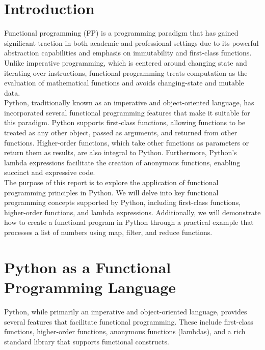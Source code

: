 \documentclass[a4paper]{article}
\begin{document}
\tableofcontents
\newpage

\section{Introduction}
Functional programming (FP) is a programming paradigm that has gained significant traction in both academic and professional settings due to its powerful abstraction capabilities and emphasis on immutability and first-class functions. Unlike imperative programming, which is centered around changing state and iterating over instructions, functional programming treats computation as the evaluation of mathematical functions and avoids changing-state and mutable data.\\

Python, traditionally known as an imperative and object-oriented language, has incorporated several functional programming features that make it suitable for this paradigm. Python supports first-class functions, allowing functions to be treated as any other object, passed as arguments, and returned from other functions. Higher-order functions, which take other functions as parameters or return them as results, are also integral to Python. Furthermore, Python's lambda expressions facilitate the creation of anonymous functions, enabling succinct and expressive code.\\

The purpose of this report is to explore the application of functional programming principles in Python. We will delve into key functional programming concepts supported by Python, including first-class functions, higher-order functions, and lambda expressions. Additionally, we will demonstrate how to create a functional program in Python through a practical example that processes a list of numbers using map, filter, and reduce functions.\\

\newpage


\section{Python as a Functional Programming Language}
Python, while primarily an imperative and object-oriented language, provides several features that facilitate functional programming. These include first-class functions, higher-order functions, anonymous functions (lambdas), and a rich standard library that supports functional constructs.\\
\end{document}

